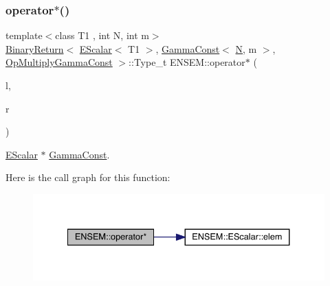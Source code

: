 \subsubsection{\texorpdfstring{operator$\ast$()}{operator*()}\hspace{0.1cm}{\footnotesize\ttfamily [3/9]}}
{\footnotesize\ttfamily template$<$class T1 , int N, int m$>$ \\
\mbox{\hyperlink{structENSEM_1_1BinaryReturn}{Binary\+Return}}$<$ \mbox{\hyperlink{classENSEM_1_1EScalar}{E\+Scalar}}$<$ T1 $>$, \mbox{\hyperlink{classENSEM_1_1GammaConst}{Gamma\+Const}}$<$ \mbox{\hyperlink{adat__devel_2lib_2hadron_2operator__name__util_8cc_a7722c8ecbb62d99aee7ce68b1752f337}{N}}, m $>$, \mbox{\hyperlink{structENSEM_1_1OpMultiplyGammaConst}{Op\+Multiply\+Gamma\+Const}} $>$\+::Type\+\_\+t E\+N\+S\+E\+M\+::operator$\ast$ (\begin{DoxyParamCaption}\item[{const \mbox{\hyperlink{classENSEM_1_1EScalar}{E\+Scalar}}$<$ T1 $>$ \&}]{l,  }\item[{const \mbox{\hyperlink{classENSEM_1_1GammaConst}{Gamma\+Const}}$<$ \mbox{\hyperlink{adat__devel_2lib_2hadron_2operator__name__util_8cc_a7722c8ecbb62d99aee7ce68b1752f337}{N}}, m $>$ \&}]{r }\end{DoxyParamCaption})\hspace{0.3cm}{\ttfamily [inline]}}



\mbox{\hyperlink{classENSEM_1_1EScalar}{E\+Scalar}} $\ast$ \mbox{\hyperlink{classENSEM_1_1GammaConst}{Gamma\+Const}}. 

Here is the call graph for this function\+:
\nopagebreak
\begin{figure}[H]
\begin{center}
\leavevmode
\includegraphics[width=334pt]{d4/dca/group__escalar_ga10de70ea3b5491035fab4f67de013321_cgraph}
\end{center}
\end{figure}
\mbox{\label{group__escalar_ga53bf11728d0f1f7fb9dea51cd221792d}} 
